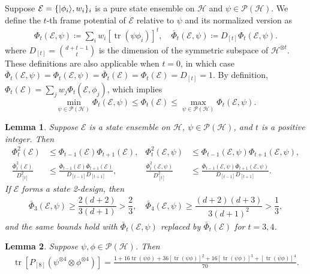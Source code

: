 \documentclass[aps,pra,twocolumn,nofootinbib,superscriptaddress,10pt]{revtex4-2}
\newtheorem{lemma}{Lemma}
\DeclarePairedDelimiter{\ket}{\lvert}{\rangle}
\DeclareMathOperator{\tr}{tr}
\newcommand{\caE}{\mathcal{E}}
\newcommand{\caH}{\mathcal{H}}
\newcommand{\caP}{\mathcal{P}}
\newcommand{\bPhi}{\bar{\Phi}}
\begin{document}
Suppose $\caE=\{\ket{\phi_{i}}, w_i\}_{i}$ is a pure state ensemble on $\caH$ and $\psi \in \caP(\caH)$. We define the $t$-th frame potential of $\caE$ relative to $\psi$ and its normalized version as
\begin{align}  \Phi_t(\caE,\psi)\coloneqq\sum_iw_i\left[\tr(\psi \phi_i)\right]^t,\quad \bPhi_t(\caE,\psi)\coloneqq D_{[t]}\Phi_t(\caE,\psi).
\end{align}
where $D_{[t]}=\binom{d + t - 1}{t}$ is the dimension of the symmetric subspace  of $\caH^{\otimes t}$. These definitions are also applicable when $t=0$, in which case 
$\bPhi_t(\caE,\psi)=\Phi_t(\caE,\psi)=\bPhi_t(\caE)=\Phi_t(\caE)=D_{[t]}=1$. 
By definition, $\Phi_t(\caE)=\sum_j w_j\Phi_t(\caE,\phi_j)$, which implies
\begin{equation}
\min_{\psi\in \caP(\caH)} \Phi_t(\caE,\psi) \le \Phi_t(\caE) \le \max_{\psi\in \caP(\caH)} \Phi_t(\caE,\psi).
\end{equation}


\begin{lemma}\label{lem:FPrelation}
Suppose $\caE$ is a state ensemble on $\caH$, $\psi\in\caP(\caH)$, and $t$ is a positive integer. Then
\begin{align}
   \Phi_t^2(\caE)&\leq \Phi_{t-1}(\caE) \Phi_{t+1}(\caE), & \Phi_t^2(\caE,\psi)&\leq \Phi_{t-1}(\caE,\psi) \Phi_{t+1}(\caE,\psi), \label{eq:FPrelation}\\
     \frac{\bPhi_t^2(\caE)}{D_{[t]}^2}&\leq \frac{\bPhi_{t-1}(\caE) \bPhi_{t+1}(\caE)}{D_{[t-1]}D_{[t+1]}},& \frac{\bPhi_t^2(\caE,\psi)}{D_{[t]}^2}&\leq \frac{\bPhi_{t-1}(\caE,\psi) \bPhi_{t+1}(\caE,\psi)}{D_{[t-1]}D_{[t+1]}}.
     \label{eq:NFPrelation}
\end{align}
If $\caE$ forms a state 2-design, then
\begin{align}
     \bPhi_3(\caE,\psi)\ge\dfrac{2(d+2)}{3(d+1)}> \dfrac{2}{3}, \quad \bPhi_4(\caE,\psi)\ge\dfrac{(d+2)(d+3)}{3(d+1)^2}> \dfrac{1}{3}, \label{eq:NFP34LB}
\end{align}
and the same bounds hold with $\bPhi_t(\caE,\psi)$ replaced by $\bPhi_t(\caE)$ for $t=3,4$.
\end{lemma}

\begin{lemma}\label{lem:8th_moment}
Suppose $\psi,\phi\in\caP(\caH)$. Then
\begin{align}
   \tr\left[P_{[8]}\left(\psi^{\otimes 4}\otimes \phi^{\otimes 4}\right)\right]=\frac{1+16\tr(\psi\phi)+36\left[\tr(\psi\phi)\right]^2+16\left[\tr(\psi\phi)\right]^3+\left[\tr(\psi\phi)\right]^4}{70}.
\end{align}
\end{lemma}
\end{document}
